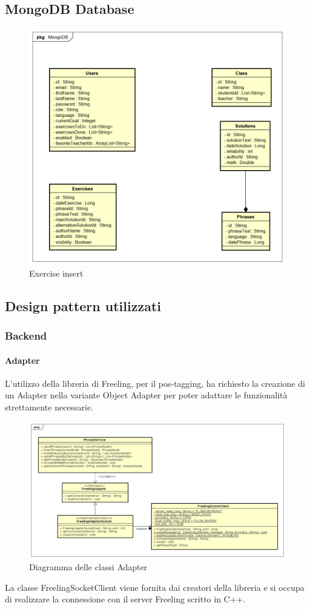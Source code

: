 \subsection{MongoDB Database}
\begin{figure}[H]
\centering
\includegraphics[width=17cm, keepaspectratio]{img/mongodb.png} 
\caption{Exercise insert}
\end{figure}
\subsection{Design pattern utilizzati}
\subsubsection{Backend}
\paragraph{Adapter}
L'utilizzo della libreria di Freeling, per il pos-tagging, ha richiesto la creazione di un Adapter nella variante Object Adapter per poter adattare le funzionalità strettamente necessarie.
\begin{figure}[H]
\includegraphics[width=17cm]{img/Adapter.png} 
\caption{Diagramma delle classi Adapter}
\end{figure}
La classe FreelingSocketClient viene fornita dai creatori della libreria e si occupa di realizzare la connessione con il server Freeling scritto in C++.
